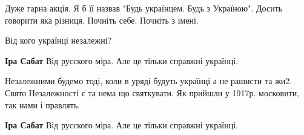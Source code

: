 \begin{itemize}
 
Дуже гарна акція. Я б її назвав "Будь українцем. Будь з Україною". Досить говорити яка різниця. Почніть себе. Почніть з імені.

 
Від кого українці незалежні?

\begin{itemize}
 
\textbf{Іра Сабат} Від русского міра. Але це тільки справжні українці.

 

Незалежними будемо тоді, коли в уряді будуть українці а не рашисти та жи2.
Свято Незалежності є та нема що святкувати. Як прийшли у 1917р. московити, так
нами і правлять.

\begin{itemize}
 
\textbf{Іра Сабат} Від русского міра. Але це тільки справжні українці.

 


\end{itemize}
\end{itemize}
\end{itemize}
